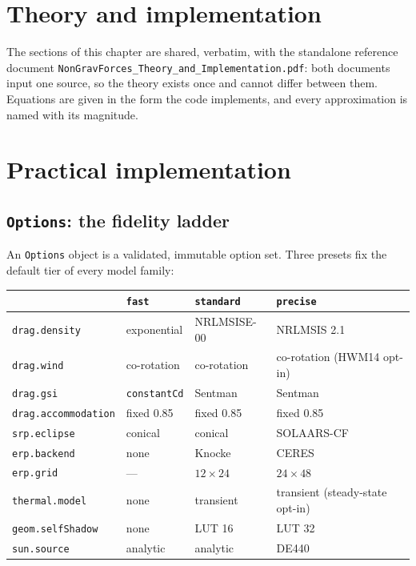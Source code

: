 \documentclass[11pt,a4paper]{report}
\begin{document}


\chapter{Theory and implementation}
\label{ch:theory}

\noindent The sections of this chapter are shared, verbatim, with the standalone reference
document \texttt{NonGravForces\_Theory\_and\_Implementation.pdf}: both documents input one
source, so the theory exists once and cannot differ between them. Equations are given in the
form the code implements, and every approximation is named with its magnitude.


\chapter{Practical implementation}
\label{ch:practical}

\section{\texttt{Options}: the fidelity ladder}
An \texttt{Options} object is a validated, immutable option set. Three presets fix the default tier
of every model family:

\begin{table}[h]\centering\footnotesize
\begin{tabular}{@{}llll@{}}\toprule
 & \texttt{fast} & \texttt{standard} & \texttt{precise}\\\midrule
\texttt{drag.density} & exponential & NRLMSISE-00 & NRLMSIS 2.1\\
\texttt{drag.wind} & co-rotation & co-rotation & co-rotation (HWM14 opt-in)\\
\texttt{drag.gsi} & \texttt{constantCd} & Sentman & Sentman\\
\texttt{drag.accommodation} & fixed 0.85 & fixed 0.85 & fixed 0.85\\
\texttt{srp.eclipse} & conical & conical & SOLAARS-CF\\
\texttt{erp.backend} & none & Knocke & CERES\\
\texttt{erp.grid} & --- & $12\times24$ & $24\times48$\\
\texttt{thermal.model} & none & transient & transient (steady-state opt-in)\\
\texttt{geom.selfShadow} & none & LUT 16 & LUT 32\\
\texttt{sun.source} & analytic & analytic & DE440\\
\bottomrule
\end{tabular}
\end{table}
\end{document}
